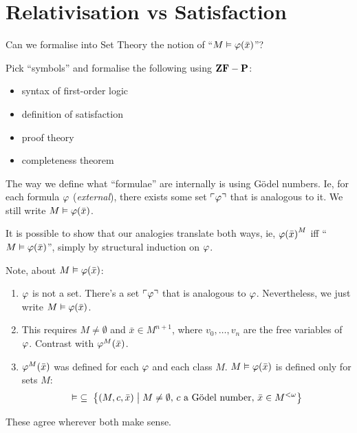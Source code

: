 \section{Relativisation vs Satisfaction} \label{Ch3:Sec:Satisfaction}

Can we formalise into Set Theory the notion of ``$M \vDash \varphi\!\left( \bar{x} \right)$''?

Pick ``symbols'' and formalise the following using $\mathbf{ZF} - \mathbf{P}$:
\begin{itemize}
    \item syntax of first-order logic
    \item definition of satisfaction
    \item proof theory
    \item completeness theorem
\end{itemize}

The way we define what ``formulae'' are internally is using Gödel numbers. Ie, for each formula $\varphi$ (\textit{external}), there exists some set $\ulcorner \varphi \urcorner$ that is analogous to it. We still write $M \vDash \varphi\!\left( \bar{x} \right)$.

It is possible to show that our analogies translate both ways, ie, $\varphi\!\left( \bar{x} \right)^M$ iff ``$M \vDash \varphi\!\left( \bar{x} \right)$'', simply by structural induction on $\varphi$.


Note, about $M \vDash \varphi\!\left( \bar{x} \right)$:
\begin{enumerate}
    \item $\varphi$ is not a set. There's a set $\ulcorner \varphi \urcorner$ that is analogous to $\varphi$. Nevertheless, we just write $M \vDash \varphi\!\left( \bar{x} \right)$.
    \item This requires $M \ne \emptyset$ and $\bar{x} \in M^{n + 1}$, where $v_0, \ldots, v_n$ are the free variables of $\varphi$. Contrast with $\varphi^M\!\left( \bar{x} \right)$.
    \item $\varphi^M\!\left( \bar{x} \right)$ was defined for each $\varphi$ and each class $M$. $M \vDash \varphi\!\left( \bar{x} \right)$ is defined only for sets $M$:
    \begin{align*}
        \vDash \; \subseteq \; \left\{ \left( M, c, \bar{x} \right) \; \middle\vert \; M \ne \emptyset, \, c \text{ a Gödel number}, \, \bar{x} \in M^{<\omega} \right\}
    \end{align*}
\end{enumerate}

These agree wherever both make sense.

